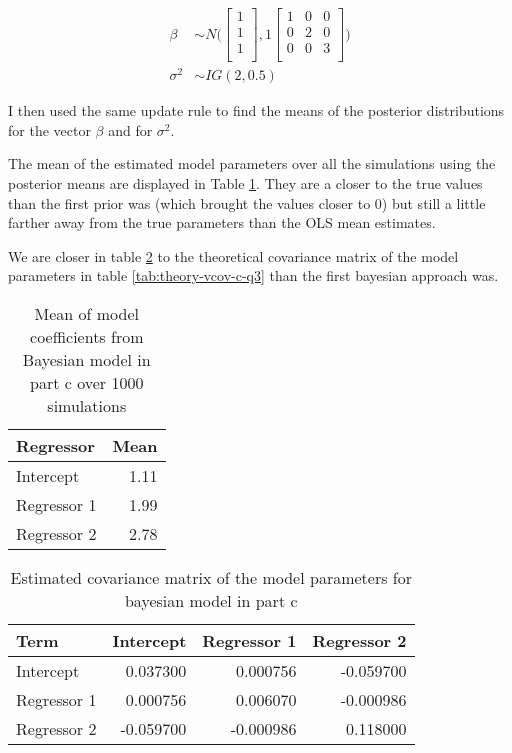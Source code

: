 \documentclass[]{book}
\begin{document}
\begin{align}
  \beta &\sim N \bigg( 
  \begin{bmatrix}
  1\\
  1\\
  1\\
  \end{bmatrix},
  1 \begin{bmatrix}
  1 & 0 & 0\\
  0 & 2 & 0\\
  0 & 0 & 3\\
  \end{bmatrix} \bigg)\\
  \sigma^2 &\sim IG(2, 0.5)
\end{align}

I then used the same update rule to find the means of the posterior distributions for the vector \(\beta\) and for \(\sigma^2\).

The mean of the estimated model parameters over all the simulations using the posterior means are displayed in Table \ref{tab:bayes-c-mean-coefs-q3}. They are a closer to the true values than the first prior was (which brought the values closer to 0) but still a little farther away from the true parameters than the OLS mean estimates.

We are closer in table \ref{tab:bayes-c-est-vcov-q3} to the theoretical covariance matrix of the model parameters in table \ref{tab:theory-vcov-c-q3} than the first bayesian approach was.

\begin{table}

\caption{\label{tab:bayes-c-mean-coefs-q3}Mean of model coefficients from Bayesian model in part c over 1000 simulations}
\centering
\begin{tabular}[t]{lr}
\toprule
Regressor & Mean\\
\midrule
Intercept & 1.11\\
Regressor 1 & 1.99\\
Regressor 2 & 2.78\\
\bottomrule
\end{tabular}
\end{table}

\begin{table}

\caption{\label{tab:bayes-c-est-vcov-q3}Estimated covariance matrix of the model parameters for bayesian model in part c}
\centering
\begin{tabular}[t]{lrrr}
\toprule
Term & Intercept & Regressor 1 & Regressor 2\\
\midrule
Intercept & 0.037300 & 0.000756 & -0.059700\\
Regressor 1 & 0.000756 & 0.006070 & -0.000986\\
Regressor 2 & -0.059700 & -0.000986 & 0.118000\\
\bottomrule
\end{tabular}
\end{table}
\end{document}
